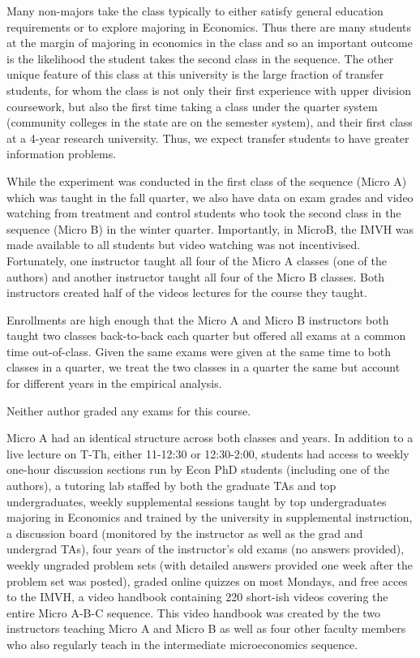 \documentclass[12pt]{article}
\begin{document}
Many non-majors take the class typically to either satisfy general education requirements or to explore majoring in Economics. Thus there are many students at the margin of majoring in economics in the class and so an important outcome is the likelihood the student takes the second class in the sequence. The other unique feature of this class at this university is the large fraction of transfer students, for whom the class is not only their first experience with upper division coursework, but also the first time taking a class under the quarter system (community colleges in the state are on the semester system), and their first class at a 4-year research university. Thus, we expect transfer students to have greater information problems.

While the experiment was conducted in the first class of the sequence (Micro A) which was taught in the fall quarter, we also have data on exam grades and video watching from treatment and control students who took the second class in the sequence (Micro B) in the winter quarter.  Importantly, in MicroB, the IMVH was made available to all students but video watching was not incentivised. Fortunately, one instructor taught all four of the Micro A classes (one of the authors) and another instructor taught all four of the Micro B classes. Both instructors created half of the videos lectures for the course they taught.

Enrollments are high enough that the Micro A and Micro B instructors both taught two classes back-to-back each quarter but offered all exams at a common time out-of-class. Given the same exams were given at the same time to both classes in a quarter, we treat the two classes in a quarter the same but account for different years in the empirical analysis.

Neither author graded any exams for this course.

Micro A had an identical structure across both classes and years. In addition to a live lecture on T-Th, either 11-12:30 or 12:30-2:00, students had access to weekly one-hour discussion sections run by Econ PhD students (including one of the authors), a tutoring lab staffed by both the graduate TAs and top undergraduates, weekly supplemental sessions taught by top undergraduates majoring in Economics and trained by the university in supplemental instruction, a discussion board (monitored by the instructor as well as the grad and undergrad TAs), four years of the instructor's old exams (no answers provided), weekly ungraded problem sets (with detailed answers provided one week after the problem set was posted), graded online quizzes on most Mondays, and free acces to the IMVH, a video handbook containing 220 short-ish videos covering the entire Micro A-B-C sequence. This video handbook was created by the two instructors teaching Micro A and Micro B as well as four other faculty members who also regularly teach in the intermediate microeconomics sequence.
\end{document}
